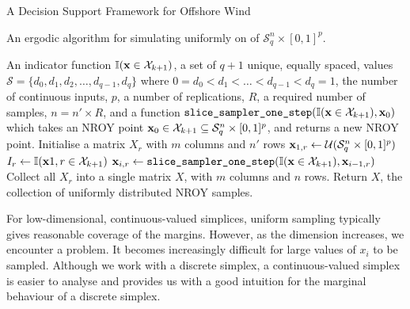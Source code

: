 \begin{chapter}{A Decision Support Framework for Offshore Wind \label{Ch:ds-for-ow}}
\begin{algorithm}[h]
\caption{An ergodic algorithm for simulating uniformly on of $\mathcal{S}^n_q \times [0, 1]^p$. \label{alg:ergodic-disc-slice}}
\begin{algorithmic}
\Require An indicator function $\mathbb{I}(\mathbf{x} \in \mathcal{X}_{k+1})$, a set of $q+1$ unique, equally spaced, values $\mathcal{S} = \{ d_0, d_1, d_2, \ldots, d_{q-1}, d_q \}$ where $0 = d_0 < d_1 < \ldots < d_{q-1} < d_q = 1$, the number of continuous inputs, $p$,  a number of replications, $R$, a required number of samples, $n =  n' \times R$, and a function $\texttt{slice\_sampler\_one\_step}(\mathbb{I}(\mathbf{x} \in \mathcal{X}_{k+1}), \mathbf{x}_0)$ which takes an NROY point $ \mathbf{x}_0 \in \mathcal{X}_{k+1} \subseteq \mathcal{S}_q^n \times [0, 1]^p$, and returns a new NROY point.
  \State Initialise a matrix $X_r$ with $m$ columns and $n'$ rows
    \State $\mathbf{x}_{1, r} \gets \mathcal{U}(\mathcal{S}_q^n \times [0, 1]^p)$ 
    \State $I_r \gets \mathbb{I}(\mathbf{x}{1, r} \in \mathcal{X}_{k+1})$
  \EndWhile
  \State $\mathbf{x}_{i, r} \gets \texttt{slice\_sampler\_one\_step}(\mathbb{I}(\mathbf{x} \in \mathcal{X}_{k+1}), \mathbf{x}_{i-1, r})$
\EndFor
\EndFor
\State Collect all $X_r$ into a single matrix $X$, with $m$ columns and $n$ rows.
\State Return $X$, the collection of uniformly distributed NROY samples.
\end{algorithmic}
\end{algorithm}

For low-dimensional, continuous-valued simplices, uniform sampling typically gives reasonable coverage of the margins. However, as the dimension increases, we encounter a problem. It becomes increasingly difficult for large values of $x_i$ to be sampled. Although we work with a discrete simplex, a continuous-valued simplex is easier to analyse and provides us with a good intuition for the marginal behaviour of a discrete simplex.


\end{chapter}
